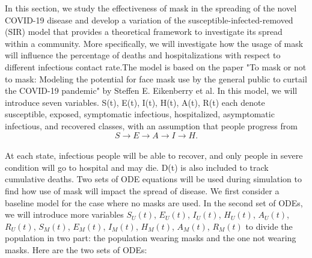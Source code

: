 \documentclass{article}
\begin{document}
In this section, we study the effectiveness of mask in the spreading of the novel COVID-19 disease and develop a variation of the susceptible-infected-removed (SIR) model that provides a theoretical framework to investigate its spread within a community. More specifically, we will investigate how the usage of mask will influence the percentage of deaths and hospitalizations with respect to different infectious contact rate.The model is based on the paper "To mask or not to mask: Modeling the potential for face mask use by the general public to curtail the COVID-19 pandemic" by Steffen E. Eikenberry et al. In this model, we will introduce seven variables. S(t), E(t), I(t), H(t), A(t), R(t) each denote susceptible, exposed, symptomatic infectious, hospitalized, asymptomatic infectious, and recovered classes, with an assumption that people progress from \\
$$S \rightarrow E \rightarrow A \rightarrow I \rightarrow H. $$ \\
At each state, infectious people will be able to recover, and only people in severe condition will go to hospital and may die. D(t) is also included to track cumulative deaths. Two sets of ODE equations will be used during simulation to find how use of mask will impact the spread of disease. We first consider a baseline model for the case where no masks are used. In the second set of ODEs, we will introduce more variables
$S_{U}(t)$, $E_{U}(t)$, $I_{U}(t)$, $H_{U}(t)$, $A_{U}(t)$, $R_{U}(t)$, $S_{M}(t)$, $E_{M}(t)$, $I_{M}(t)$, $H_{M}(t)$, $A_{M}(t)$, $R_{M}(t)$ to divide the population in two part: the population wearing masks and the one not wearing masks.
Here are the two sets of ODEs:\\
\end{document}
